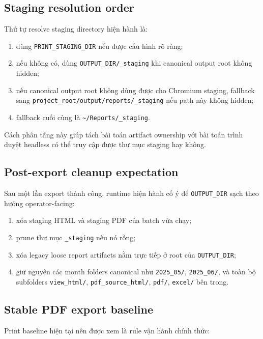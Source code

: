 \subsection{Staging resolution order}

Thứ tự resolve staging directory hiện hành là:

\begin{enumerate}[label=-]
\item dùng \texttt{PRINT\_STAGING\_DIR} nếu được cấu hình rõ ràng;
\item nếu không có, dùng \texttt{OUTPUT\_DIR/\_staging} khi canonical output root không hidden;
\item nếu canonical output root không dùng được cho Chromium staging, fallback sang \texttt{project\_root/output/reports/\_staging} nếu path này không hidden;
\item fallback cuối cùng là \texttt{\textasciitilde/Reports/\_staging}.
\end{enumerate}

Cách phân tầng này giúp tách bài toán artifact ownership với bài toán trình duyệt headless có thể truy cập được thư mục staging hay không.

\subsection{Post-export cleanup expectation}

Sau một lần export thành công, runtime hiện hành cố ý để \texttt{OUTPUT\_DIR} sạch theo hướng operator-facing:

\begin{enumerate}[label=-]
\item xóa staging HTML và staging PDF của batch vừa chạy;
\item prune thư mục \texttt{\_staging} nếu nó rỗng;
\item xóa legacy loose report artifacts nằm trực tiếp ở root của \texttt{OUTPUT\_DIR};
\item giữ nguyên các month folders canonical như \texttt{2025\_05/}, \texttt{2025\_06/}, và toàn bộ subfolders \texttt{view\_html/}, \texttt{pdf\_source\_html/}, \texttt{pdf/}, \texttt{excel/} bên trong.
\end{enumerate}

\subsection{Stable PDF export baseline}

Print baseline hiện tại nên được xem là rule vận hành chính thức:

